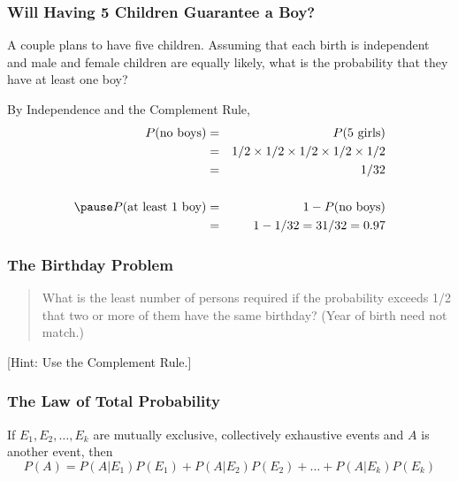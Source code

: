 \documentclass{beamer}
\begin{document}
\begin{frame}
\frametitle{Will Having 5 Children Guarantee a Boy? }
A couple plans to have five children. Assuming that each birth is independent and male and female children are equally likely, what is the probability that they have at least one boy?
\vspace{1em}

\pause
\alert{By Independence and the Complement Rule,}
	\begin{eqnarray*}
		P(\mbox{no boys})&=& P(\mbox{5 girls})\\
							&=& 1/2 \times 1/2 \times 1/2 \times 1/2 \times 1/2\\
							&=&\ 1/32\\ \\ \pause
		P(\mbox{at least 1 boy})&=&1 - P(\mbox{no boys})\\
		&=&1 - 1/32 =31/32 = 0.97
	\end{eqnarray*}

\end{frame}

\begin{frame}
\frametitle{The Birthday Problem}
	\begin{quote}
		What is the least number of persons required if the probability exceeds 1/2 that two or more of them have the same birthday? (Year of birth need not match.)
	\end{quote}
	
	\hfill \alert{[Hint: Use the Complement Rule.]}
\end{frame}

\begin{frame}
\frametitle{The Law of Total Probability}
If $E_1, E_2, \hdots, E_k$ are mutually exclusive, collectively exhaustive events and $A$ is another event, then
	$$P(A) = P(A|E_1)P(E_1) + P(A|E_2)P(E_2) + \hdots + P(A|E_k)P(E_k)$$

\end{frame}
\end{document}
